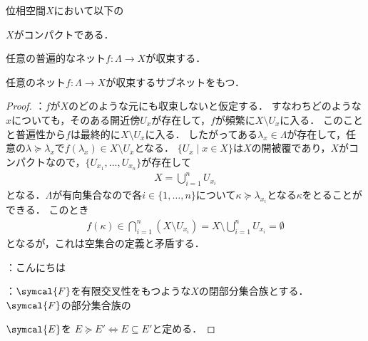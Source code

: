 \documentclass{ltjsbook}
\begin{document}
\begin{thmbox}
\begin{theorem}
位相空間\(X\)において以下の
\begin{conditions}
    \item\label{compact-net-compact} \(X\)がコンパクトである．
    \item\label{compact-net-univ} 任意の普遍的なネット\(f\colon \Lambda \to X\)が収束する．
    \item\label{compact-net-subnet} 任意のネット\(f \colon \Lambda \to X\)が収束するサブネットをもつ．
\end{conditions}
\end{theorem}
\end{thmbox}

\begin{proof} ：\(f\)が\(X\)のどのような元にも収束しないと仮定する．
すなわちどのような\(x\)についても，そのある開近傍\(U_x\)が存在して，\(f\)が頻繁に\(X \setminus U_x\)に入る．
このことと普遍性から\(f\)は最終的に\(X \setminus U_x\)に入る．
したがってある\(\lambda_x \in \Lambda\)が存在して，任意の\(\lambda \succeq \lambda_x\)で\(f(\lambda_x) \in X \setminus U_x\)となる．
\(\{U_x \mid x \in X\}\)は\(X\)の開被覆であり，\(X\)がコンパクトなので，\(\{U_{x_1}, \ldots, U_{x_n}\}\)が存在して
\begin{align*}
    X = \bigcup_{i = 1}^n U_{x_i}
\end{align*}
となる．\(\Lambda\)が有向集合なので各\(i \in \{1, \ldots, n\}\)について\(\kappa \succeq \lambda_{x_i}\)となる\(\kappa\)をとることができる．
このとき
\begin{align*}
    f(\kappa) \in \bigcap_{i = 1}^n (X \setminus U_{x_i})
              = X \setminus \bigcup_{i = 1}^n U_{x_i}
              = \emptyset
\end{align*}
となるが，これは空集合の定義と矛盾する．

：こんにちは


：\(\symcal{F}\)を有限交叉性をもつような\(X\)の閉部分集合族とする．
\(\symcal{F}\)の部分集合族の


\(\symcal{E}\)を
\(E \succeq E' \Leftrightarrow E \subseteq E'\)と定める．
\end{proof}
\end{document}
